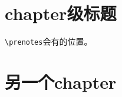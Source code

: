 \documentclass[10pt]{book}
\begin{document}
\pagestyle{mystyle}

\chapter{chapter级标题}


\verb|\prenotes|会有的位置。

\prenotesblank


\blankpar

\blankpar

\zhlipsum[1-2]

\chapter{另一个chapter}

\zhlipsum[1]
\end{document}
